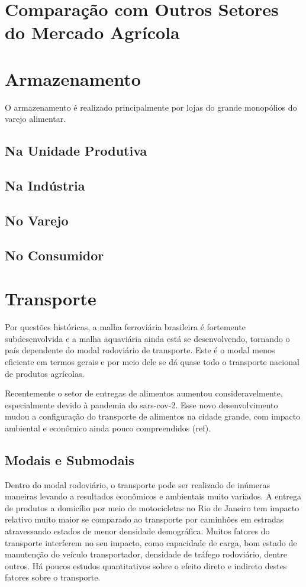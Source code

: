 \documentclass[]{article}
\begin{document}
	
	\section{Comparação com Outros Setores do Mercado Agrícola}
	
	\section{Armazenamento}
	O armazenamento é realizado principalmente por lojas do grande monopólios do varejo alimentar.
	
	\subsection{Na Unidade Produtiva}
	
	\subsection{Na Indústria}
	
	\subsection{No Varejo}
	\subsection{No Consumidor}
	
	\section{Transporte}
	Por questões históricas, a malha ferroviária brasileira é fortemente subdesenvolvida e a malha aquaviária ainda está se desenvolvendo, tornando o país dependente do modal rodoviário de transporte. Este é o modal menos eficiente em termos gerais e por meio dele se dá quase todo o transporte nacional de produtos agrícolas. 
	
	Recentemente o setor de entregas de alimentos aumentou consideravelmente, especialmente devido à pandemia do sars-cov-2. Esse novo desenvolvimento mudou a configuração do transporte de alimentos na cidade grande, com impacto ambiental e econômico ainda pouco compreendidos (ref). 
	
	\subsection{Modais e Submodais}
	
	Dentro do modal rodoviário, o transporte pode ser realizado de inúmeras maneiras levando a resultados econômicos e ambientais muito variados. A entrega de produtos a domicílio por meio de motocicletas no Rio de Janeiro tem impacto relativo muito maior se comparado ao transporte por caminhões em estradas atravessando estados de menor densidade demográfica. Muitos fatores do transporte interferem no seu impacto, como capacidade de carga, bom estado de manutenção do veículo transportador, densidade de tráfego rodoviário, dentre outros. Há poucos estudos quantitativos sobre o efeito direto e indireto destes fatores sobre o transporte.
	
\end{document}
